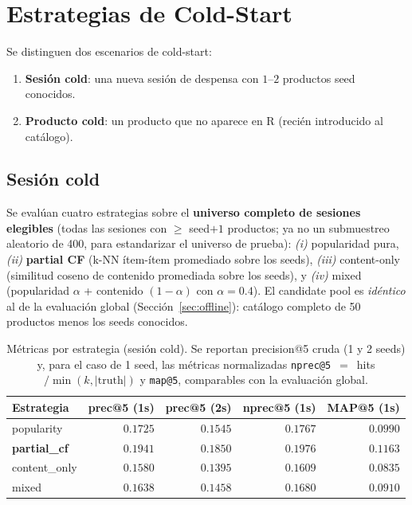 \documentclass[12pt,a4paper]{article}
\newcommand{\code}[1]{\texttt{\small #1}}
\begin{document}
\section{Estrategias de Cold-Start}

Se distinguen dos escenarios de cold-start:

\begin{enumerate}
    \item \textbf{Sesión cold}: una nueva sesión de despensa con $1$--$2$ productos seed conocidos.
    \item \textbf{Producto cold}: un producto que no aparece en R (recién introducido al catálogo).
\end{enumerate}

\subsection{Sesión cold}

Se evalúan cuatro estrategias sobre el \textbf{universo completo de sesiones elegibles} (todas las sesiones con $\ge$ seed$+1$ productos; ya no un submuestreo aleatorio de 400, para estandarizar el universo de prueba):
\textit{(i)} popularidad pura, \textit{(ii)} \textbf{partial CF} (k-NN ítem-ítem promediado sobre los seeds), \textit{(iii)} content-only (similitud coseno de contenido promediada sobre los seeds), y \textit{(iv)} mixed (popularidad $\alpha$ + contenido $(1-\alpha)$ con $\alpha = 0.4$). El candidate pool es \emph{idéntico} al de la evaluación global (Sección~\ref{sec:offline}): catálogo completo de 50 productos menos los seeds conocidos.

\begin{table}[H]
\centering
\caption{Métricas por estrategia (sesión cold). Se reportan precision@5 cruda (1 y 2 seeds) y, para el caso de 1 seed, las métricas normalizadas \code{nprec@5}~$=$~hits$/\min(k,|\text{truth}|)$ y \code{map@5}, comparables con la evaluación global.}
\label{tab:cold}
\begin{tabular}{lrrrr}
\toprule
Estrategia & prec@5 (1s) & prec@5 (2s) & nprec@5 (1s) & MAP@5 (1s) \\
\midrule
popularity   & $0.1725$ & $0.1545$ & $0.1767$ & $0.0990$ \\
\rowcolor{green!12}
\textbf{partial\_cf}   & $\mathbf{0.1941}$ & $\mathbf{0.1850}$ & $\mathbf{0.1976}$ & $\mathbf{0.1163}$ \\
content\_only & $0.1580$ & $0.1395$ & $0.1609$ & $0.0835$ \\
mixed         & $0.1638$ & $0.1458$ & $0.1680$ & $0.0910$ \\
\bottomrule
\end{tabular}
\end{table}
\end{document}
